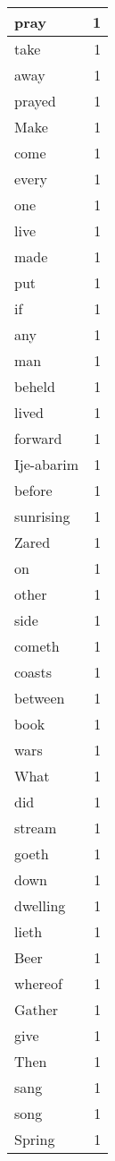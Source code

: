 \begin{center}
\begin{longtable}{l|r}
pray & 1 \\ \hline
take & 1 \\ \hline
away & 1 \\ \hline
prayed & 1 \\ \hline
Make & 1 \\ \hline
come & 1 \\ \hline
every & 1 \\ \hline
one & 1 \\ \hline
live & 1 \\ \hline
made & 1 \\ \hline
put & 1 \\ \hline
if & 1 \\ \hline
any & 1 \\ \hline
man & 1 \\ \hline
beheld & 1 \\ \hline
lived & 1 \\ \hline
forward & 1 \\ \hline
Ije-abarim & 1 \\ \hline
before & 1 \\ \hline
sunrising & 1 \\ \hline
Zared & 1 \\ \hline
on & 1 \\ \hline
other & 1 \\ \hline
side & 1 \\ \hline
cometh & 1 \\ \hline
coasts & 1 \\ \hline
between & 1 \\ \hline
book & 1 \\ \hline
wars & 1 \\ \hline
What & 1 \\ \hline
did & 1 \\ \hline
stream & 1 \\ \hline
goeth & 1 \\ \hline
down & 1 \\ \hline
dwelling & 1 \\ \hline
lieth & 1 \\ \hline
Beer & 1 \\ \hline
whereof & 1 \\ \hline
Gather & 1 \\ \hline
give & 1 \\ \hline
Then & 1 \\ \hline
sang & 1 \\ \hline
song & 1 \\ \hline
Spring & 1 \\ \hline

\end{longtable}
\end{center}
